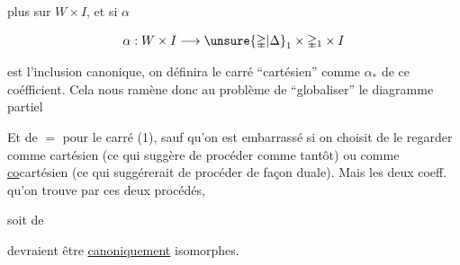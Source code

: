 
plus  sur $W\times I$, et si  $\alpha$

\[
\alpha:W\times I\longrightarrow\unsure{\mathbb{\Delta}|\Delta}_{1}\times\mathbb{\Delta}_{1}\times I
\]

est l'inclusion canonique, on définira le carré ``cartésien'' comme  $\alpha_{*}$ de ce coéfficient. Cela nous ramène donc au problème de ``globaliser''  le diagramme partiel


Et de $=$ pour le carré (1), sauf qu'on est embarrassé si on choisit de le regarder  comme cartésien (ce qui suggère de procéder comme tantôt) ou comme \uline{co}cartésien (ce qui suggérerait de procéder de façon duale). Mais les deux coeff. qu'on trouve par ces deux procédés,  


soit de


devraient être \uline{canoniquement} isomorphes.



